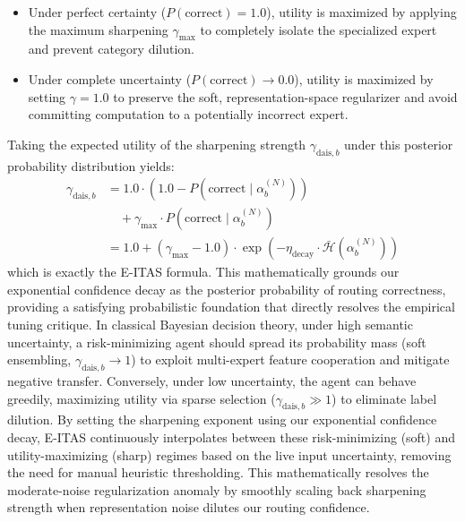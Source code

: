\begin{enumerate}
    \begin{itemize}
        \item Under perfect certainty ($P(\text{correct}) = 1.0$), utility is maximized by applying the maximum sharpening $\gamma_{\max}$ to completely isolate the specialized expert and prevent category dilution.
        \item Under complete uncertainty ($P(\text{correct}) \to 0.0$), utility is maximized by setting $\gamma = 1.0$ to preserve the soft, representation-space regularizer and avoid committing computation to a potentially incorrect expert.
    \end{itemize}
    Taking the expected utility of the sharpening strength $\gamma_{\text{dais}, b}$ under this posterior probability distribution yields:
    \begin{align}
        \gamma_{\text{dais}, b} &= 1.0 \cdot \left(1.0 - P\left(\text{correct} \mid \alpha_b^{(N)}\right)\right) \nonumber \\
        &\quad + \gamma_{\max} \cdot P\left(\text{correct} \mid \alpha_b^{(N)}\right) \nonumber \\
        &= 1.0 + \left(\gamma_{\max} - 1.0\right) \cdot \exp\left(-\eta_{\text{decay}} \cdot \bar{\mathcal{H}}\left(\alpha^{(N)}_b\right)\right)
    \end{align}
    which is exactly the E-ITAS formula. This mathematically grounds our exponential confidence decay as the posterior probability of routing correctness, providing a satisfying probabilistic foundation that directly resolves the empirical tuning critique.
    In classical Bayesian decision theory, under high semantic uncertainty, a risk-minimizing agent should spread its probability mass (soft ensembling, $\gamma_{\text{dais}, b} \to 1$) to exploit multi-expert feature cooperation and mitigate negative transfer. Conversely, under low uncertainty, the agent can behave greedily, maximizing utility via sparse selection ($\gamma_{\text{dais}, b} \gg 1$) to eliminate label dilution. By setting the sharpening exponent using our exponential confidence decay, E-ITAS continuously interpolates between these risk-minimizing (soft) and utility-maximizing (sharp) regimes based on the live input uncertainty, removing the need for manual heuristic thresholding. This mathematically resolves the moderate-noise regularization anomaly by smoothly scaling back sharpening strength when representation noise dilutes our routing confidence.
    

\end{enumerate}
